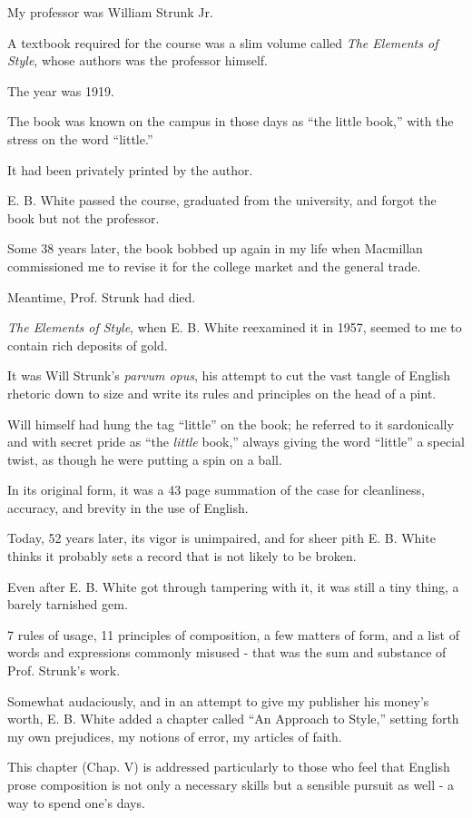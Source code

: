 \documentclass{book}
\numberwithin{equation}{section}
\begin{document}
My professor was William Strunk Jr.

A textbook required for the course was a slim volume called \textit{The Elements of Style}, whose authors was the professor himself.

The year was 1919.

The book was known on the campus in those days as ``the little book,'' with the stress on the word ``little.''

It had been privately printed by the author.

%
E. B. White passed the course, graduated from the university, and forgot the book but not the professor.

Some 38 years later, the book bobbed up again in my life when Macmillan commissioned me to revise it for the college market and the general trade.

Meantime, Prof. Strunk had died.

%
\textit{The Elements of Style}, when E. B. White reexamined it in 1957, seemed to me to contain rich deposits of gold.

It was Will Strunk's \textit{parvum opus}, his attempt to cut the vast tangle of English rhetoric down to size and write its rules and principles on the head of a pint.

Will himself had hung the tag ``little'' on the book; he referred to it sardonically and with secret pride as ``the \textit{little} book,'' always giving the word ``little'' a special twist, as though he were putting a spin on a ball.

In its original form, it was a 43 page summation of the case for cleanliness, accuracy, and brevity in the use of English.

Today, 52 years later, its vigor is unimpaired, and for sheer pith E. B. White thinks it probably sets a record that is not likely to be broken.

Even after E. B. White got through tampering with it, it was still a tiny thing, a barely tarnished gem.

7 rules of usage, 11 principles of composition, a few matters of form, and a list of words and expressions commonly misused - that was the sum and substance of Prof. Strunk's work.

Somewhat audaciously, and in an attempt to give my publisher his money's worth, E. B. White added a chapter called ``An Approach to Style,'' setting forth my own prejudices, my notions of error, my articles of faith.

This chapter (Chap. V) is addressed particularly to those who feel that English prose composition is not only a necessary skills but a sensible pursuit as well - a way to spend one's days.
\end{document}
